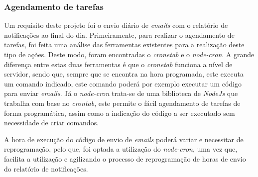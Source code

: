 \subsubsection{Agendamento de tarefas}

Um requisito deste projeto foi o envio diário de \textit{emails} com o relatório de notificações ao final do dia. Primeiramente, para realizar o agendamento de tarefas, foi feita uma análise das ferramentas existentes para a realização deste tipo de ações. Deste modo, foram encontradas o \textit{cronetab} e o \textit{node-cron}. A grande diferença entre estas duas ferramentas é que o \textit{cronetab} funciona a nível de servidor, sendo que, sempre que se encontra na hora programada, este executa um comando indicado, este comando poderá por exemplo executar um código para enviar \textit{emails}. Já o \textit{node-cron} trata-se de uma biblioteca de \textit{NodeJs} que trabalha com base no \textit{crontab}, este permite o fácil agendamento de tarefas de forma programática, assim como a indicação do código a ser executado sem necessidade de criar comandos.

A hora de execução do código de envio de \textit{emails} poderá variar e necessitar de reprogramação, pelo que, foi optada a utilização do \textit{node-cron}, uma vez que, facilita a utilização e agilizando o processo de reprogramação de horas de envio do relatório de notificações.